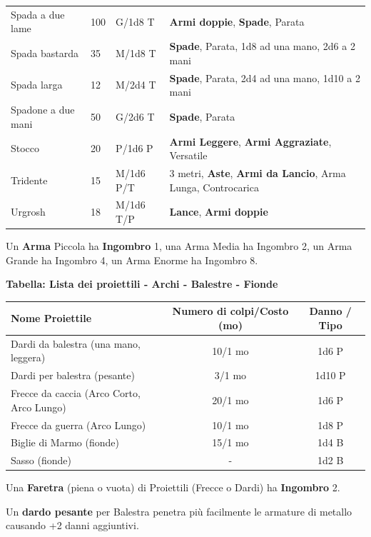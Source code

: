 \begin{xltabular}{1\textwidth}{lllX}
Spada a due lame& 100& G/1d8 T& \textbf{Armi doppie}, \textbf{Spade}, Parata\\
Spada bastarda& 35 & M/1d8 T&\textbf{Spade}, Parata, 1d8 ad una mano, 2d6 a 2 mani\\
Spada larga& 12 & M/2d4 T&\textbf{Spade}, Parata, 2d4 ad una mano, 1d10 a 2 mani\\
Spadone a due mani& 50 & G/2d6 T&\textbf{Spade}, Parata\\
Stocco& 20 & P/1d6 P& \textbf{Armi Leggere}, \textbf{Armi Aggraziate}, Versatile\\
Tridente& 15 & M/1d6 P/T& 3 metri, \textbf{Aste}, \textbf{Armi da Lancio}, Arma Lunga, Controcarica\\
Urgrosh& 18 & M/1d6 T/P& \textbf{Lance}, \textbf{Armi doppie}\\
\end{xltabular}

\medskip

Un \textbf{Arma} Piccola ha \textbf{Ingombro} 1, una Arma Media ha Ingombro 2, un Arma Grande ha Ingombro 4, un Arma Enorme ha Ingombro 8.

\medskip

\textbf{Tabella: Lista dei proiettili - Archi - Balestre - Fionde}\label{proiettili}

\noindent\begin{tabular}{lcc}
	\toprule
\textbf{Nome Proiettile}& \textbf{Numero di colpi/Costo (mo)} & \textbf{Danno / Tipo}\\
\toprule
Dardi da balestra (una mano, leggera) & 10/1 mo & 1d6 P\\
Dardi per balestra (pesante) & 3/1 mo & 1d10 P\\
Frecce da caccia (Arco Corto, Arco Lungo)& 20/1 mo & 1d6 P\\
Frecce da guerra (Arco Lungo)& 10/1 mo & 1d8 P\\
Biglie di Marmo (fionde)& 15/1 mo & 1d4 B\\
Sasso (fionde)& -& 1d2 B
\end{tabular}

\medskip

Una \textbf{Faretra} (piena o vuota) di Proiettili (Frecce o Dardi) ha \textbf{Ingombro} 2.

Un \textbf{dardo pesante} per Balestra penetra più facilmente le armature di metallo causando +2 danni aggiuntivi.


